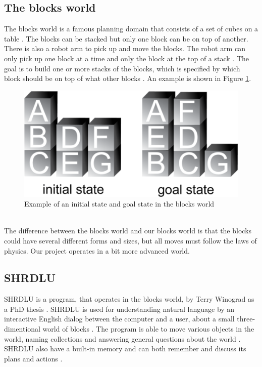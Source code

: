\subsection{The blocks world}
The blocks world is a famous planning domain that consists of a set of cubes on a table \citep{blocksworld_ai}. The blocks can be stacked but only one block can be on top of another. There is also a robot arm to pick up and move the blocks. The robot arm can only pick up one block at a time and only the block at the top of a stack \citep{blocksworld_ai}. The goal is to build one or more stacks of the blocks, which is specified by which block should be on top of what other blocks \citep{blocksworld_ai}. An example is shown in Figure \ref{fig:blocksworld}.
\begin{figure}[h!]
\centering
\includegraphics[scale = 0.4]{fig/blocksworld.png}
\caption{Example of an initial state and goal state in the blocks world \citep{blocksworld_fig}}
\label{fig:blocksworld}
\end{figure}\\
The difference between the blocks world and our blocks world is that the blocks could have several different forms and sizes, but all moves must follow the laws of physics. Our project operates in a bit more advanced world. 

\subsection{SHRDLU}
SHRDLU is a program, that operates in the blocks world, by Terry Winograd as a PhD thesis \citep{SHRDLU_url}. SHRDLU is used for understanding natural language by an interactive English dialog between the computer and a user, about a small three-dimentional world of blocks \citep{SHRDLU_url}. The program is able to move various objects in the world, naming collections and answering general questions about the world \citep{SHRDLU_url2}. SHRDLU also have a built-in memory and can both remember and discuss its plans and actions \citep{SHRDLU_url2}.


